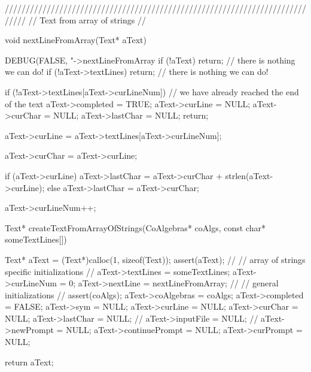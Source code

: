 /////////////////////////////////////////////////////////////////////////////
// Text from array of strings
//

void nextLineFromArray(Text* aText) {
  DEBUG(FALSE, "->nextLineFromArray %
  if (!aText) return;  // there is nothing we can do!
  if (!aText->textLines) return; // there is nothing we can do!

  if (!aText->textLines[aText->curLineNum]) {
    // we have already reached the end of the text
    aText->completed  = TRUE;
    aText->curLine    = NULL;
    aText->curChar    = NULL;
    aText->lastChar   = NULL;
    return;
  }

  aText->curLine  = aText->textLines[aText->curLineNum];

  aText->curChar  = aText->curLine;

  if (aText->curLine) {
    aText->lastChar = aText->curChar + strlen(aText->curLine);
  } else aText->lastChar = aText->curChar;

  aText->curLineNum++;
}

Text* createTextFromArrayOfStrings(CoAlgebras* coAlgs,
                                   const char* someTextLines[]) {
  Text* aText = (Text*)calloc(1, sizeof(Text));
  assert(aText);
  //
  // array of strings specific initializations
  //
  aText->textLines  = someTextLines;
  aText->curLineNum = 0;
  aText->nextLine   = nextLineFromArray;
  //
  // general initializations
  //
  assert(coAlgs);
  aText->coAlgebras = coAlgs;
  aText->completed  = FALSE;
  aText->sym        = NULL;
  aText->curLine    = NULL;
  aText->curChar    = NULL;
  aText->lastChar   = NULL;
  //
  aText->inputFile  = NULL;
  //
  aText->newPrompt       = NULL;
  aText->continuePrompt  = NULL;
  aText->curPrompt       = NULL;

  return aText;
}
\stoptyping
